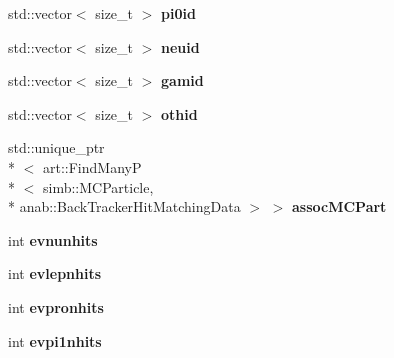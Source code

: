 \begin{DoxyCompactItemize}
\item 
\hypertarget{classanalysis_1_1SlicePurCompl_aaa4d7b9339cb5e7e1b2abce6b4784532}{std\-::vector$<$ size\-\_\-t $>$ {\bfseries pi0id}}\label{classanalysis_1_1SlicePurCompl_aaa4d7b9339cb5e7e1b2abce6b4784532}

\item 
\hypertarget{classanalysis_1_1SlicePurCompl_a1f6b97343b50a45f6d08c9b7a77cafc8}{std\-::vector$<$ size\-\_\-t $>$ {\bfseries neuid}}\label{classanalysis_1_1SlicePurCompl_a1f6b97343b50a45f6d08c9b7a77cafc8}

\item 
\hypertarget{classanalysis_1_1SlicePurCompl_a4123f24a7b7c48a0b8d035d8f6cd8855}{std\-::vector$<$ size\-\_\-t $>$ {\bfseries gamid}}\label{classanalysis_1_1SlicePurCompl_a4123f24a7b7c48a0b8d035d8f6cd8855}

\item 
\hypertarget{classanalysis_1_1SlicePurCompl_ab09dc6647525b89ebee6e9ee622cce58}{std\-::vector$<$ size\-\_\-t $>$ {\bfseries othid}}\label{classanalysis_1_1SlicePurCompl_ab09dc6647525b89ebee6e9ee622cce58}

\item 
\hypertarget{classanalysis_1_1SlicePurCompl_aee3dce7966b5e1ea71c93413bcbc6d8a}{std\-::unique\-\_\-ptr\\*
$<$ art\-::\-Find\-Many\-P\\*
$<$ simb\-::\-M\-C\-Particle, \\*
anab\-::\-Back\-Tracker\-Hit\-Matching\-Data $>$ $>$ {\bfseries assoc\-M\-C\-Part}}\label{classanalysis_1_1SlicePurCompl_aee3dce7966b5e1ea71c93413bcbc6d8a}

\item 
\hypertarget{classanalysis_1_1SlicePurCompl_abb4d90c2bccf98be8583ee7ec4786e7b}{int {\bfseries evnunhits}}\label{classanalysis_1_1SlicePurCompl_abb4d90c2bccf98be8583ee7ec4786e7b}

\item 
\hypertarget{classanalysis_1_1SlicePurCompl_acb6c47c5f5079404267f46ad6ccd843e}{int {\bfseries evlepnhits}}\label{classanalysis_1_1SlicePurCompl_acb6c47c5f5079404267f46ad6ccd843e}

\item 
\hypertarget{classanalysis_1_1SlicePurCompl_a3b7e6beaede5fdaab4b4d58e3702fea1}{int {\bfseries evpronhits}}\label{classanalysis_1_1SlicePurCompl_a3b7e6beaede5fdaab4b4d58e3702fea1}

\item 
\hypertarget{classanalysis_1_1SlicePurCompl_a2b450063c61b0408260de63628f3d544}{int {\bfseries evpi1nhits}}\label{classanalysis_1_1SlicePurCompl_a2b450063c61b0408260de63628f3d544}


\end{DoxyCompactItemize}
